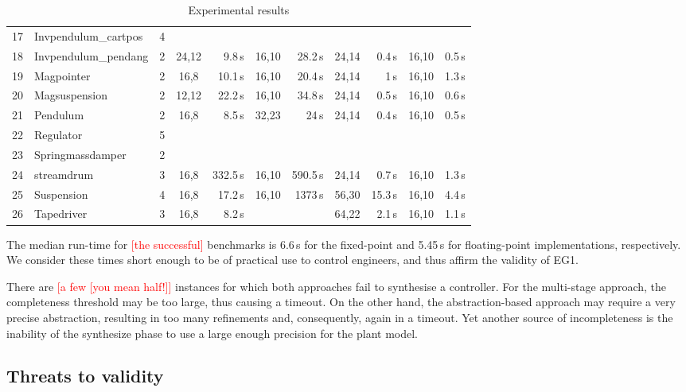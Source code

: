 \documentclass[twocolumn]{autart}    %
\newcommand{\xmark}{\ding{55}}
\renewcommand{\note}[1]{\textcolor{red}{[#1]}}
\begin{document}
\begin{table}
\begin{tabular}{| r | l | c | c | r | c | r | c | r | c | r |}
17 & Invpendulum\_cartpos & 4 & & ~\xmark & & ~\xmark & & ~\xmark & & ~\xmark\\
18 & Invpendulum\_pendang & 2 & 24,12 & 9.8\,s & 16,10 & 28.2\,s & 24,14 & 0.4\,s & 16,10 & 0.5\,s\\
19 & Magpointer   & 2 & 16,8 & 10.1\,s & 16,10 & 20.4\,s & 24,14  & 1\,s& 16,10 & 1.3\,s\\
20 & Magsuspension  & 2 & 12,12  & 22.2\,s  & 16,10 & 34.8\,s & 24,14 & 0.5\,s & 16,10 & 0.6\,s\\
21 & Pendulum   & 2 & 16,8 & 8.5\,s & 32,23 & 24\,s & 24,14 & 0.4\,s & 16,10 & 0.5\,s\\
22 & Regulator   & 5 & & ~\xmark & & ~\xmark & & ~\xmark & & ~\xmark\\
23 & Springmassdamper & 2 & & ~\xmark & & ~\xmark & & ~\xmark & & ~\xmark\\
24 & streamdrum   & 3 & 16,8  & 332.5\,s & 16,10 & 590.5\,s & 24,14 & 0.7\,s & 16,10 &1.3\,s\\
25 & Suspension  & 4 & 16,8  & 17.2\,s & 16,10 &1373\,s & 56,30 & 15.3\,s & 16,10 & 4.4\,s\\
26 & Tapedriver   & 3 & 16,8  & 8.2\,s & & ~\xmark & 64,22 & 2.1\,s & 16,10 & 1.1\,s\\
\hline
%
\end{tabular}
\vspace{0.05in}
\caption{Experimental results\label{tab:results}}
\end{table}

The median run-time for \note{the successful} benchmarks is 6.6\,s for the fixed-point and 5.45\,s for floating-point implementations, respectively.  
We consider these times short enough to be of practical use to control engineers, and thus affirm the validity of EG1.

There are \note{a few [you mean half!]} instances for which both approaches fail to synthesise a controller.  
For the multi-stage approach, the completeness threshold may be too large, thus causing a timeout.  
On the other hand, the abstraction-based approach may require a very precise abstraction, resulting in too many refinements and, consequently, again in a timeout.  
Yet another source of incompleteness is the inability of the {\sc synthesize} phase to use a large enough precision for
the plant model.

\subsection{Threats to validity}
\label{exp:threats-to-validity}
\end{document}
